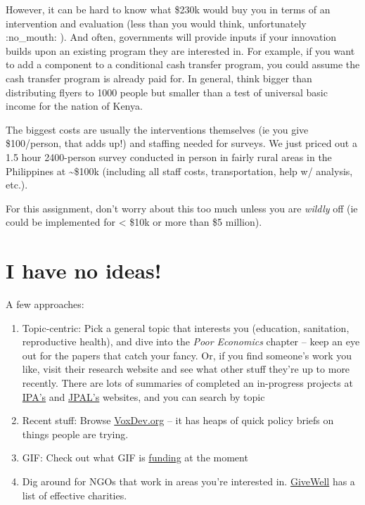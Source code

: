 \documentclass[11pt]{article}
\begin{document}
However, it can be hard to know what \$230k would buy you in terms of an
intervention and evaluation (less than you would think, unfortunately
:no\_mouth: ). And often, governments will provide inputs if your
innovation builds upon an existing program they are interested in. For
example, if you want to add a component to a conditional cash transfer
program, you could assume the cash transfer program is already paid for.
In general, think bigger than distributing flyers to 1000 people but
smaller than a test of universal basic income for the nation of Kenya.

The biggest costs are usually the interventions themselves (ie you give
\$100/person, that adds up!) and staffing needed for surveys. We just
priced out a 1.5 hour 2400-person survey conducted in person in fairly
rural areas in the Philippines at \textasciitilde\$100k (including all
staff costs, transportation, help w/ analysis, etc.).

For this assignment, don't worry about this too much unless you are
\emph{wildly} off (ie could be implemented for \textless{} \$10k or more
than \$5 million).

\hypertarget{i-have-no-ideas}{%
\section*{I have no ideas!}\label{i-have-no-ideas}}

A few approaches:

\begin{enumerate}
\def\labelenumi{\arabic{enumi}.}
\item
  Topic-centric: Pick a general topic that interests you (education,
  sanitation, reproductive health), and dive into the \emph{Poor
  Economics} chapter -- keep an eye out for the papers that catch your
  fancy. Or, if you find someone's work you like, visit their research
  website and see what other stuff they're up to more recently. There
  are lots of summaries of completed an in-progress projects at
  \href{https://www.poverty-action.org/}{IPA's} and
  \href{https://www.povertyactionlab.org/}{JPAL's} websites, and you can
  search by topic
\item
  Recent stuff: Browse \href{https://voxdev.org/}{VoxDev.org} -- it has
  heaps of quick policy briefs on things people are trying.
\item
  GIF: Check out what GIF is
  \href{https://www.globalinnovation.fund/our-investments/\#investments-page+types-of-investments:grant}{funding}
  at the moment
\item
  Dig around for NGOs that work in areas you're interested in.
  \href{https://www.givewell.org/}{GiveWell} has a list of effective
  charities.
\end{enumerate}
\end{document}
